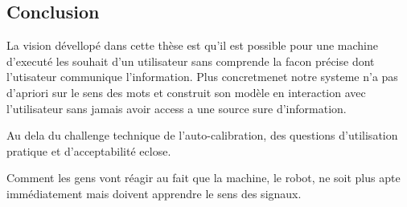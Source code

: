 \subsection*{Conclusion}

La vision dévellopé dans cette thèse est qu'il est possible pour une machine d'executé les souhait d'un utilisateur sans comprende la facon précise dont l'utisateur communique l'information. Plus concretmenet notre systeme n'a pas d'apriori sur le sens des mots et construit son modèle en interaction avec l'utilisateur sans jamais avoir access a une source sure d'information.

Au dela du challenge technique de l'auto-calibration, des questions d'utilisation pratique et d'acceptabilité eclose.

Comment les gens vont réagir au fait que la machine, le robot, ne soit plus apte immédiatement mais doivent apprendre le sens des signaux.
